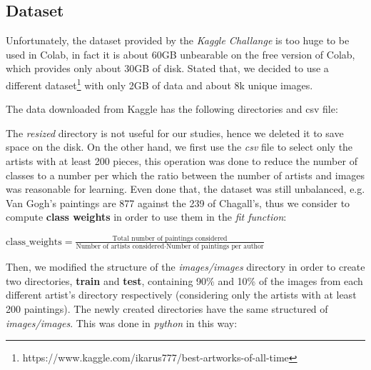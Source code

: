 \subsection{Dataset}
Unfortunately, the dataset provided by the \textit{Kaggle Challange} is too huge to be used in Colab, in fact it is about 60GB unbearable on the free version of Colab, which provides only about 30GB of disk. Stated that, we decided to use a different dataset\footnote{https://www.kaggle.com/ikarus777/best-artworks-of-all-time} with only 2GB of data and about 8k unique images.

\noindent The data downloaded from Kaggle has the following directories and csv file:

\noindent The \textit{resized} directory is not useful for our studies, hence we deleted it to save space on the disk. On the other hand, we first use the \textit{csv} file to select only the artists with at least 200 pieces, this operation was done to reduce the number of classes to a number per which the ratio between the number of artists and images was reasonable for learning. Even done that, the dataset was still unbalanced, e.g. Van Gogh's paintings are 877 against the 239 of Chagall's, thus we consider to compute \textbf{class weights} in order to use them in the \textit{fit function}:

$
	\text{class\_weights} = \frac{\text{Total number of paintings considered}}{\text{Number of artists considered}\cdot \text{Number of paintings per author}}
$

\noindent Then, we modified the structure of the \textit{images/images} directory in order to create two directories, \textbf{train} and \textbf{test}, containing 90\% and 10\% of the images from each different artist's directory respectively (considering only the artists with at least 200 paintings). The newly created directories have the same structured of \textit{images/images}. This was done in \textit{python} in this way:


